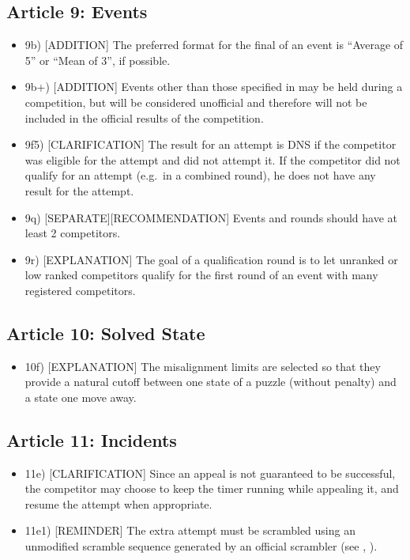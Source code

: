 \subsection{ Article 9: Events}

\begin{itemize}
\item
  9b) {[}ADDITION{]} The preferred format for the final of an event is
  ``Average of 5'' or ``Mean of 3'', if possible.
\item
  9b+) {[}ADDITION{]} Events other than those specified in may be held
  during a competition, but will be considered unofficial and therefore
  will not be included in the official results of the competition.
\item
  9f5) {[}CLARIFICATION{]} The result for an attempt is DNS if the
  competitor was eligible for the attempt and did not attempt it. If the
  competitor did not qualify for an attempt (e.g.~in a combined round),
  he does not have any result for the attempt.
\item
  9q) {[}SEPARATE{]}{[}RECOMMENDATION{]} Events and rounds should have
  at least 2 competitors.
\item
  9r) {[}EXPLANATION{]} The goal of a qualification round is to let
  unranked or low ranked competitors qualify for the first round of an
  event with many registered competitors.
\end{itemize}

\subsection{ Article 10: Solved State}

\begin{itemize}
\item
  10f) {[}EXPLANATION{]} The misalignment limits are selected so that
  they provide a natural cutoff between one state of a puzzle (without
  penalty) and a state one move away.
\end{itemize}

\subsection{ Article 11: Incidents}

\begin{itemize}
\item
  11e) {[}CLARIFICATION{]} Since an appeal is not guaranteed to be
  successful, the competitor may choose to keep the timer running while
  appealing it, and resume the attempt when appropriate.
\item
  11e1) {[}REMINDER{]} The extra attempt must be scrambled using an
  unmodified scramble sequence generated by an official scrambler (see ,
  ).
\end{itemize}

